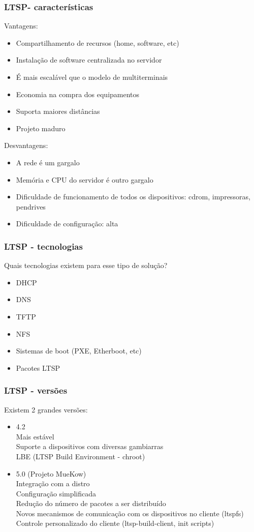 \documentclass[utf8,9pt]{beamer}
\begin{document}
	  \begin{frame}
		  \frametitle{LTSP- características}
		  Vantagens:
		  \begin{itemize}
			  \item Compartilhamento de recursos (home, software, etc)
			  \item Instalação de software centralizada no servidor
			  \item É mais escalável que o modelo de multiterminais
			  \item Economia na compra dos equipamentos
			  \item Suporta maiores distâncias 
			  \item Projeto maduro
		  \end{itemize}

		  Desvantagens:
		  \begin{itemize}
			  \item A rede é um gargalo
			  \item Memória e CPU do servidor é outro gargalo
			  \item Dificuldade de funcionamento de todos os dispositivos: cdrom, impressoras, pendrives
			  \item Dificuldade de configuração: alta
		  \end{itemize}
	  \end{frame}

	  \begin{frame}
		  \frametitle{LTSP - tecnologias}
		  Quais tecnologias existem para esse tipo de solução?
		  \begin{itemize}
			  \item DHCP
			  \item DNS
			  \item TFTP
			  \item NFS
			  \item Sistemas de boot (PXE, Etherboot, etc)
			  \item Pacotes LTSP
		  \end{itemize}
	  \end{frame}

	  \begin{frame}
		  \frametitle{LTSP - versões}
		  Existem 2 grandes versões:
		  \begin{itemize}
			  \item 4.2 \\
				  Mais estável\\
				  Suporte a dispositivos com diversas gambiarras\\
				  LBE (LTSP Build Environment - chroot)
				  
			  \item 5.0 (Projeto MueKow)\\
				  Integração com a distro\\
				  Configuração simplificada\\
				  Redução do número de pacotes a ser distribuído\\
				  Novos mecanismos de comunicação com os dispositivos no cliente (ltspfs)\\
				  Controle personalizado do cliente (ltsp-build-client, init scripts)
		  \end{itemize}
	  \end{frame}
\end{document}
